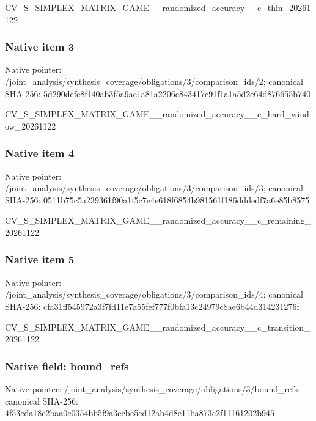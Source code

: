 \documentclass[10pt,a4paper]{article}
\begin{document}
CV\_S\_SIMPLEX\_MATRIX\_GAME\allowbreak{}\_\_randomized\_accuracy\_\_c\allowbreak{}\_thin\_20261122


\subsubsection{Native item 3}


Native pointer: /joint\_analysis/synthesi\allowbreak{}s\_coverage/obligations/3\allowbreak{}/comparison\_ids/2; canonical SHA-256: 5d290defc8f140ab3f5a9ae1\allowbreak{}a81a2206c843417c91f1a1a5\allowbreak{}d2e64d876655b740


CV\_S\_SIMPLEX\_MATRIX\_GAME\allowbreak{}\_\_randomized\_accuracy\_\_c\allowbreak{}\_hard\_window\_20261122


\subsubsection{Native item 4}


Native pointer: /joint\_analysis/synthesi\allowbreak{}s\_coverage/obligations/3\allowbreak{}/comparison\_ids/3; canonical SHA-256: 0511b75c5a239361f90a1f5c\allowbreak{}7e4e618f6854b981561f186d\allowbreak{}ddedf7a6e85b8575


CV\_S\_SIMPLEX\_MATRIX\_GAME\allowbreak{}\_\_randomized\_accuracy\_\_c\allowbreak{}\_remaining\_20261122


\subsubsection{Native item 5}


Native pointer: /joint\_analysis/synthesi\allowbreak{}s\_coverage/obligations/3\allowbreak{}/comparison\_ids/4; canonical SHA-256: cfa31ff545972a3f7fd11e7a\allowbreak{}55fef777f0bfa13c24979c8a\allowbreak{}e6b44d314231276f


CV\_S\_SIMPLEX\_MATRIX\_GAME\allowbreak{}\_\_randomized\_accuracy\_\_c\allowbreak{}\_transition\_20261122


\subsubsection{Native field: bound\_refs}


Native pointer: /joint\_analysis/synthesi\allowbreak{}s\_coverage/obligations/3\allowbreak{}/bound\_refs; canonical SHA-256: 4f53cda18c2baa0c0354bb5f\allowbreak{}9a3ecbe5ed12ab4d8e11ba87\allowbreak{}3c2f11161202b945
\end{document}
